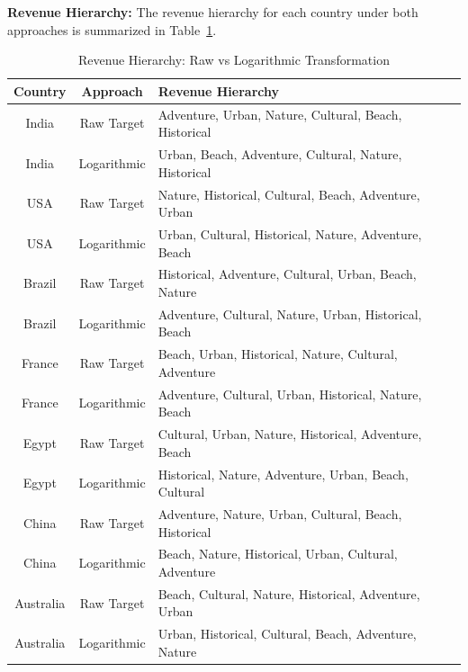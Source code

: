 \documentclass{article}
\begin{document}
\textbf{Revenue Hierarchy:}
The revenue hierarchy for each country under both approaches is summarized in Table~\ref{tab:revenue_hierarchy}.

\begin{table}[H]
\centering
\begin{tabular}{|c|c|l|}
\hline
\textbf{Country} & \textbf{Approach} & \textbf{Revenue Hierarchy} \\ \hline
India & Raw Target & Adventure, Urban, Nature, Cultural, Beach, Historical \\
India & Logarithmic & Urban, Beach, Adventure, Cultural, Nature, Historical \\ \hline
USA & Raw Target & Nature, Historical, Cultural, Beach, Adventure, Urban \\
USA & Logarithmic & Urban, Cultural, Historical, Nature, Adventure, Beach \\ \hline
Brazil & Raw Target & Historical, Adventure, Cultural, Urban, Beach, Nature \\
Brazil & Logarithmic & Adventure, Cultural, Nature, Urban, Historical, Beach \\ \hline
France & Raw Target & Beach, Urban, Historical, Nature, Cultural, Adventure \\
France & Logarithmic & Adventure, Cultural, Urban, Historical, Nature, Beach \\ \hline
Egypt & Raw Target & Cultural, Urban, Nature, Historical, Adventure, Beach \\
Egypt & Logarithmic & Historical, Nature, Adventure, Urban, Beach, Cultural \\ \hline
China & Raw Target & Adventure, Nature, Urban, Cultural, Beach, Historical \\
China & Logarithmic & Beach, Nature, Historical, Urban, Cultural, Adventure \\ \hline
Australia & Raw Target & Beach, Cultural, Nature, Historical, Adventure, Urban \\
Australia & Logarithmic & Urban, Historical, Cultural, Beach, Adventure, Nature \\ \hline
\end{tabular}
\caption{Revenue Hierarchy: Raw vs Logarithmic Transformation}
\label{tab:revenue_hierarchy}
\end{table}
\end{document}
